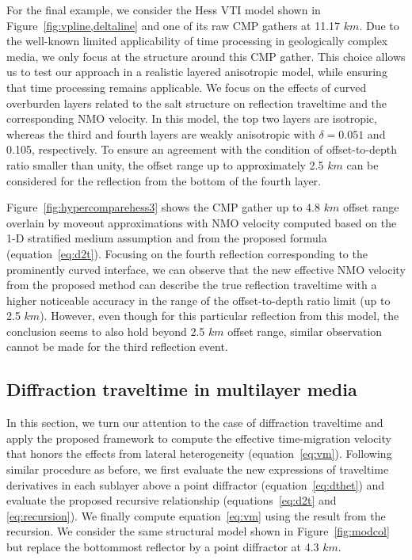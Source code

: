 For the final example, we consider the Hess VTI model shown in Figure~\ref{fig:vpline,deltaline} and one of its raw CMP gathers at 11.17 $km$. Due to the well-known limited applicability of time processing in geologically complex media, we only focus at the structure around this CMP gather. This choice allows us to test our approach in a realistic layered anisotropic model, while ensuring that time processing remains applicable. We focus on the effects of curved overburden layers related to the salt structure on reflection traveltime and the corresponding NMO velocity. In this model, the top two layers are isotropic, whereas the third and fourth layers are weakly anisotropic with $\delta=0.051$ and 0.105, respectively. To ensure an agreement with the condition of offset-to-depth ratio smaller than unity, the offset range up to approximately 2.5 $km$ can be considered for the reflection from the bottom of the fourth layer.


Figure~\ref{fig:hypercomparehess3} shows the CMP gather up to 4.8 $km$ offset range overlain by moveout approximations with NMO velocity computed based on the 1-D stratified medium assumption and from the proposed formula (equation~\ref{eq:d2t}). Focusing on the fourth reflection corresponding to the prominently curved interface, we can observe that the new effective NMO velocity from the proposed method can describe the true reflection traveltime with a higher noticeable accuracy in the range of the offset-to-depth ratio limit (up to 2.5 $km$). However, even though for this particular reflection from this model, the conclusion seems to also hold beyond 2.5 $km$ offset range, similar observation cannot be made for the third reflection event.


\subsection{Diffraction traveltime in multilayer media}
In this section, we turn our attention to the case of diffraction traveltime and apply the proposed framework to compute the effective time-migration velocity that honors the effects from lateral heterogeneity (equation~\ref{eq:vm}). Following similar procedure as before, we first evaluate the new expressions of traveltime derivatives in each sublayer above a point diffractor (equation~\ref{eq:dthet}) and evaluate the proposed recursive relationship (equations~\ref{eq:d2t} and \ref{eq:recursion}). We finally compute equation~\ref{eq:vm} using the result from the recursion. We consider the same structural model shown in Figure~\ref{fig:modcol} but replace the bottommost reflector by a point diffractor at 4.3 $km$.


